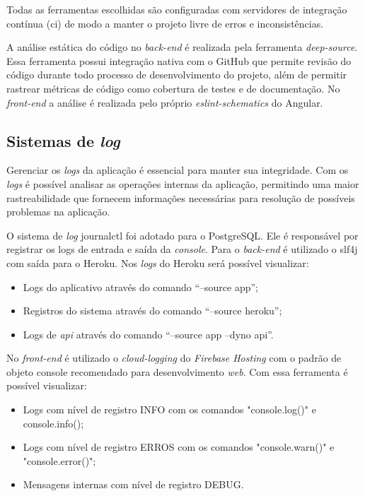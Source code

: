 Todas as ferramentas escolhidas são configuradas com servidores de integração contínua (\ac{ci}) de modo a manter o projeto livre de erros e inconsistências.


A análise estática do código no \textit{\gls{back-end}} é realizada pela ferramenta \textit{\gls{deep-source}}. Essa ferramenta possui integração nativa com o GitHub que permite revisão do código durante todo processo de desenvolvimento do projeto, além de permitir rastrear métricas de código como cobertura de testes e de documentação. No \textit{\gls{front-end}} a análise é realizada pelo próprio \textit{\gls{eslint-schematics}} do Angular.


\subsection{Sistemas de \textit{log}}
Gerenciar os \textit{\glspl{log}} da aplicação é essencial para manter sua integridade. Com os \textit{\glspl{log}} é possível analisar as operações internas da aplicação, permitindo uma maior rastreabilidade que fornecem informações necessárias para resolução de possíveis problemas na aplicação.


O sistema de \textit{\gls{log}} \gls{journalctl} foi adotado para o PostgreSQL. Ele é responsável por registrar os logs de entrada e saída da \textit{console}. 
Para o \textit{\gls{back-end}} é utilizado o \ac{slf4j} com saída para o Heroku.  Nos \textit{\glspl{log}}  do Heroku será possível visualizar: 
\begin{itemize}
\item Logs do aplicativo através do comando “--source app”;
\item Registros do sistema através do comando “--source heroku”;
\item Logs de \textit{\ac{api}} através do comando “--source app --dyno api”.
\end{itemize}


No \textit{front-end} é utilizado o \textit{\gls{cloud-logging}} do \textit{Firebase Hosting} com o padrão de objeto console recomendado para desenvolvimento \textit{web}. Com essa ferramenta é possível visualizar:
\begin{itemize}
\item Logs com nível de registro INFO com os comandos "console.log()" e console.info();
\item Logs com nível de registro ERROS com os comandos "console.warn()" e "console.error()";
\item Mensagens internas com nível de registro DEBUG.
\end{itemize}

